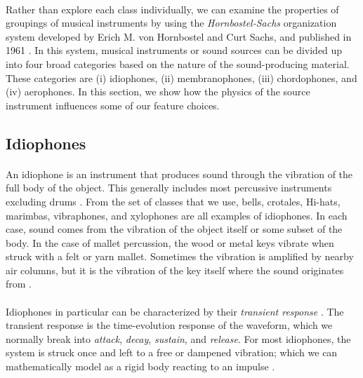 \documentclass[12pt,letterpaper]{article}
\begin{document}
\paragraph*{}Rather than explore each class individually, we can examine the properties of groupings of musical instruments by using the \textit{Hornbostel-Sachs} organization system developed by  Erich M. von Hornbostel and Curt Sachs, and published in 1961 \cite{Hornbostel}. In this system, musical instruments or sound sources can be divided up into four broad categories based on the nature of the sound-producing material. These categories are (i) idiophones, (ii) membranophones, (iii) chordophones, and (iv) aerophones. In this section, we show how the physics of the source instrument influences some of our feature choices.


\subsection{Idiophones}
\label{subsec-Idiophone}

\paragraph*{}An idiophone is an instrument that produces sound through the vibration of the full body of the object. This generally includes most percussive instruments excluding drums \cite{Hornbostel}. From the set of classes that we use, bells, crotales, Hi-hats, marimbas, vibraphones, and xylophones are all examples of idiophones. In each case, sound comes from the vibration of the object itself or some subset of the body. In the case of mallet percussion, the wood or metal keys vibrate when struck with a felt or yarn mallet. Sometimes the vibration is amplified by nearby air columns, but it is the vibration of the key itself where the sound originates from \cite{Olson}.

\paragraph*{}Idiophones in particular can be characterized by their \textit{transient response} \cite{White}. The transient response is the time-evolution response of the waveform, which we normally break into \textit{attack}, \textit{decay}, \textit{sustain}, and \textit{release}. For most idiophones, the system is struck once and left to a free or dampened vibration; which we can mathematically model as a rigid body reacting to an impulse \cite{Hunter,Olson}.
\end{document}
